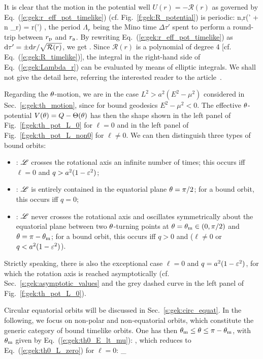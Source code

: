 It is clear that the motion in the potential well $U(r) = - \mathcal{R}(r)$
as governed by Eq.~(\ref{e:gek:r_eff_pot_timelike})
(cf. Fig.~\ref{f:gek:R_potential}) is periodic:
\be
    \forall n\in{},\quad r(\tau' + n \Lambda_r) = r(\tau') ,
\ee
the period
$\Lambda_r$ being the Mino time $\Delta\tau'$ spent to perform a round-trip
between $r_{\rm p}$ and $r_{\rm a}$. By rewriting Eq.~(\ref{e:gek:r_eff_pot_timelike})
as $\mathrm{d}\tau' = \pm \mathrm{d} r / \sqrt{\mathcal{R}(r)}$, we get
\be \label{e:gek:Lambda_r}
    .
\ee
Since $\mathcal{R}(r)$ is a polynomial of degree 4 [cf. Eq.~(\ref{e:gek:R_timelike})],
the integral in the right-hand side of Eq.~(\ref{e:gek:Lambda_r}) can
be evaluated by means of elliptic integrals. We shall not give the detail
here, referring the interested reader to the article~\cite{FujitH09}.

Regarding the $\theta$-motion, we are in the case $L^2 > a^2(E^2 - \mu^2)$
considered in Sec.~\ref{s:gek:th_motion}, since for bound geodesics $E^2 - \mu^2 < 0$.
The effective $\theta$-potential $V(\theta) = Q - \Theta(\theta)$ has then the shape shown in
the left panel of Fig.~\ref{f:gek:th_pot_L_0} for $\ell=0$ and in the left panel
of Fig.~\ref{f:gek:th_pot_L_non0} for $\ell\neq 0$.
We can then distinguish three types of bound orbits:
\begin{itemize}
\item {}: $\mathscr{L}$ crosses the rotational axis an infinite number
of times; this occurs iff $\ell=0$ and $q > a^2 ( 1-\varepsilon^2)$;
\item {}: $\mathscr{L}$ is entirely contained in the
equatorial plane $\theta=\pi/2$; for a bound orbit, this occurs iff $q=0$;
\item {}: $\mathscr{L}$ never crosses the rotational axis and oscillates symmetrically about the equatorial plane between
two $\theta$-turning points at $\theta = \theta_{\rm m} \in (0,\pi /2)$ and $\theta=\pi-\theta_{\rm m}$;
for a bound orbit, this occurs iff $q>0$ and ($\ell\neq 0$ or $q<a^2 ( 1-\varepsilon^2)$).
\end{itemize}
Strictly speaking, there is also the exceptional case $\ell=0$ and
$q = a^2 (1 -\varepsilon^2)$, for which the rotation axis is reached
asymptotically (cf. Sec.~\ref{s:gek:asymptotic_values} and the grey dashed curve
in the left panel of Fig.~\ref{f:gek:th_pot_L_0}).

Circular equatorial orbits will be discussed in Sec.~\ref{s:gek:circ_equat}.
In the following, we focus on non-polar and non-equatorial orbits, which
constitute the generic category of bound timelike orbits.
One has then $\theta_{\rm m} \leq \theta \leq \pi - \theta_{\rm m}$, with $\theta_{\rm m}$ given by
Eq.~(\ref{e:gek:th0_E_lt_mu}):
\be \label{e:gek:th_min_arccos}
     ,
\ee
which reduces to Eq.~(\ref{e:gek:th0_L_zero}) for $\ell = 0$:
\be
   _{\, }
\ee

